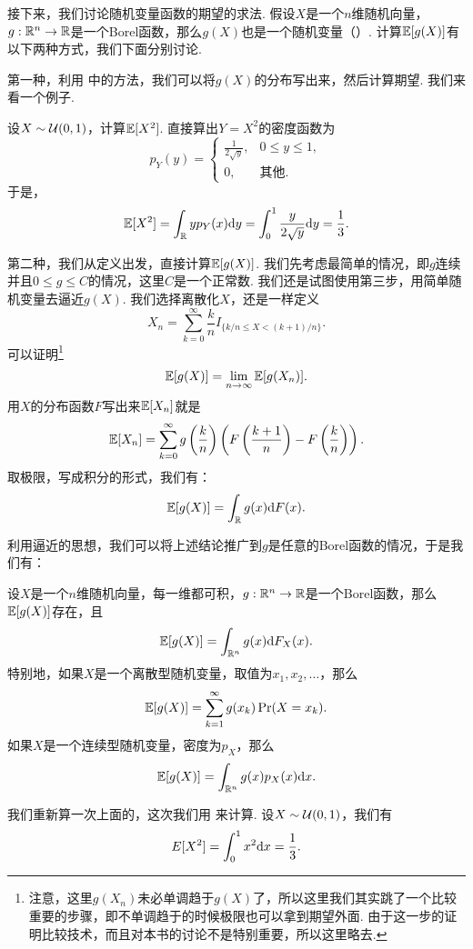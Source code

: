 接下来，我们讨论随机变量函数的期望的求法. 假设$X$是一个$n$维随机向量，$g:\mathbb{R}^n\to\mathbb{R}$是一个Borel函数，那么$g(X)$也是一个随机变量（）. 计算$\mathbb{E}[g(X)]$有以下两种方式，我们下面分别讨论. 

第一种，利用 中的方法，我们可以将$g(X)$的分布写出来，然后计算期望. 我们来看一个例子. 

\begin{example}\label{ex:uniform-square}
设$X\sim\mathcal{U}(0,1)$，计算$\mathbb{E}[X^2]$. 直接算出$Y=X^2$的密度函数为
\[p_Y(y)=\begin{cases}
    \frac{1}{2\sqrt{y}},&0\leq y\leq 1,\\
    0,&\text{其他}.
\end{cases}\]
于是，
\[\mathbb{E}[X^2]=\int_{\mathbb{R}} y p_Y(x)\mathrm{d} y=\int_0^1\frac{y}{2\sqrt{y}}\mathrm{d} y=\frac{1}{3}.\]
\end{example}

第二种，我们从定义出发，直接计算$\mathbb{E}[g(X)]$. 我们先考虑最简单的情况，即$g$连续并且$0\leq g\leq C$的情况，这里$C$是一个正常数. 我们还是试图使用第三步，用简单随机变量去逼近$g(X)$. 我们选择离散化$X$，还是一样定义
\[X_n=\sum_{k=0}^\infty\frac{k}{n}I_{\{k/n\leq X<(k+1)/n\}}.\]
可以证明\footnote{注意，这里$g(X_n)$未必单调趋于$g(X)$了，所以这里我们其实跳了一个比较重要的步骤，即不单调趋于的时候极限也可以拿到期望外面. 由于这一步的证明比较技术，而且对本书的讨论不是特别重要，所以这里略去. }
\[\mathbb{E}[g(X)]=\lim_{n\to\infty}\mathbb{E}[g(X_n)].\]
用$X$的分布函数$F$写出来$\mathbb{E}[X_n]$就是
\begin{align*}
    \mathbb{E}[X_n]=\sum_{k=0}^\infty g\left(\frac{k}{n}\right)\left(F\left(\frac{k+1}{n}\right)-F\left(\frac{k}{n}\right)\right).
\end{align*}
取极限，写成积分的形式，我们有：
\[\mathbb{E}[g(X)]=\int_{\mathbb{R}} g(x)\mathrm{d} F(x).\]

利用逼近的思想，我们可以将上述结论推广到$g$是任意的Borel函数的情况，于是我们有：

\begin{proposition}\label{prop:expectation-function}
设$X$是一个$n$维随机向量，每一维都可积，$g:\mathbb{R}^n\to\mathbb{R}$是一个Borel函数，那么$\mathbb{E}[g(X)]$存在，且
\[\mathbb{E}[g(X)]=\int_{\mathbb{R}^n} g(x)\mathrm{d} F_X(x).\]
特别地，如果$X$是一个离散型随机变量，取值为$x_1,x_2,\dots$，那么
\[\mathbb{E}[g(X)]=\sum_{k=1}^\infty g(x_k)\Pr(X=x_k).\]
如果$X$是一个连续型随机变量，密度为$p_X$，那么
\[\mathbb{E}[g(X)]=\int_{\mathbb{R}^n} g(x)p_X(x)\mathrm{d} x.\]
\end{proposition}

\begin{example}
我们重新算一次上面的，这次我们用 来计算. 设$X\sim\mathcal{U}(0,1)$，我们有
\[E[X^2]=\int_0^1 x^2\mathrm{d} x=\frac{1}{3}.\]
\end{example}

